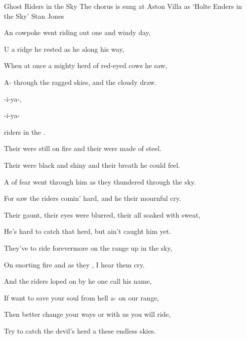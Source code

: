 \begin{SBSong}{Ghost Riders in the Sky}
  {The chorus is sung at Aston Villa as `Holte Enders in the Sky'}
  {Stan Jones}
  \begin{SBVerse}
	An  cowpoke went riding out one  and windy day,
	
	U a ridge he rested as he  along his way,

	When  at once a mighty herd of red-eyed cows he saw,

	A- through the ragged skies, and  the cloudy draw.
  \end{SBVerse}
  \begin{SBChorus}
	-i-ya-, 

    -i-ya- 

	 riders in the .
  \end{SBChorus}
  \begin{SBVerse}
	Their  were still on fire and their  were made of steel.

	Their  were black and shiny and their  breath he could feel.

	A  of fear went through him as they thundered through the sky.

	For  saw the riders comin' hard, and he  their mournful cry.
  \end{SBVerse}
  \begin{SBVerse}
	Their  gaunt, their eyes were blurred, their  all soaked with sweat,
	
	He's  hard to catch that herd, but  ain't caught him yet.
	
	They've  to ride forevermore on the range up in the sky,
	
	On  snorting fire and as they , I hear them cry.
  \end{SBVerse}
  \begin{SBVerse}
    And  the riders loped on by he  one call his name,

    If  want to save your soul from hell a- on our range,

    Then  better change your ways or with us you will ride,

    Try to catch the devil's herd a these endless skies.
  \end{SBVerse}
\end{SBSong}
